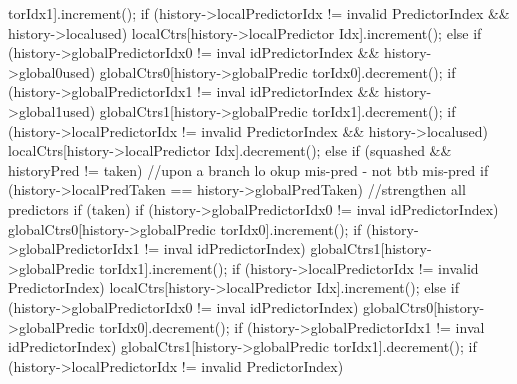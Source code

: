 \begin{DoxyCode}
{{{{{      torIdx1].increment();
                                        if (history->localPredictorIdx != invalid
      PredictorIndex && history->localused)
                                                localCtrs[history->localPredictor
      Idx].increment();
                                } else {
                                        if (history->globalPredictorIdx0 != inval
      idPredictorIndex && history->global0used)
                                                globalCtrs0[history->globalPredic
      torIdx0].decrement();
                                        if (history->globalPredictorIdx1 != inval
      idPredictorIndex && history->global1used)
                                                globalCtrs1[history->globalPredic
      torIdx1].decrement();
                                        if (history->localPredictorIdx != invalid
      PredictorIndex && history->localused)
                                                localCtrs[history->localPredictor
      Idx].decrement();
                                }
                        }
                } else if (squashed && historyPred != taken) { //upon a branch lo
      okup mis-pred - not btb mis-pred
                        if (history->localPredTaken == history->globalPredTaken) 
      {
                                //strengthen all predictors
                                if (taken) {
                                        if (history->globalPredictorIdx0 != inval
      idPredictorIndex)
                                                globalCtrs0[history->globalPredic
      torIdx0].increment();
                                        if (history->globalPredictorIdx1 != inval
      idPredictorIndex)
                                                globalCtrs1[history->globalPredic
      torIdx1].increment();
                                        if (history->localPredictorIdx != invalid
      PredictorIndex)
                                                localCtrs[history->localPredictor
      Idx].increment();
                                } else {
                                        if (history->globalPredictorIdx0 != inval
      idPredictorIndex)
                                                globalCtrs0[history->globalPredic
      torIdx0].decrement();
                                        if (history->globalPredictorIdx1 != inval
      idPredictorIndex)
                                                globalCtrs1[history->globalPredic
      torIdx1].decrement();
                                        if (history->localPredictorIdx != invalid
      PredictorIndex)
}}}}}
\end{DoxyCode}

